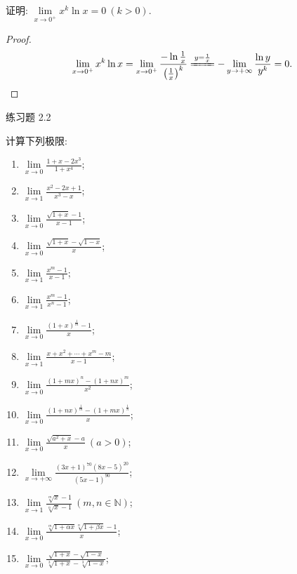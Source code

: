\begin{example}\label{ex:2.2.15}
证明: $\lim\limits_{x \to 0^+} x^k \ln x = 0\ (k > 0)$.
\end{example}

\begin{proof}
\[
\lim_{x\to 0^{+}}x^{k}\ln x = \lim_{x\to 0^{+}}\frac{-\ln\frac{1}{x}}{\left(\frac{1}{x}\right)^{k}} \xlongequal{y=\frac{1}{x}} -\lim_{y\to+\infty}\frac{\ln y}{y^{k}}=0.
\]
\end{proof}

\begin{exblock}{练习题 2.2}
\item 计算下列极限:
  \begin{enumerate}[label=(\arabic*)]
    \item $\lim\limits_{x \to 0} \frac{1 + x - 2x^{3}}{1 + x^{4}}$;
    \item $\lim\limits_{x \to 1} \frac{x^2 - 2x + 1}{x^3 - x}$;
    \item $\lim\limits_{x \to 0} \frac{\sqrt{1+x}-1}{x-1}$;
    \item $\lim\limits_{x \to 0} \frac{\sqrt{1+x} - \sqrt{1-x}}{x}$;
    \item $\lim\limits_{x \to 1} \frac{x^m - 1}{x - 1}$;
    \item $\lim\limits_{x \to 1} \frac{x^m - 1}{x^n - 1}$;
    \item $\lim\limits_{x \to 0} \frac{(1+x)^{\frac{1}{m}} - 1}{x}$;
    \item $\lim\limits_{x \to 1} \frac{x + x^{2} + \cdots + x^{m} - m}{x - 1}$;
    \item $\lim\limits_{x \to 0} \frac{(1+mx)^n - (1+nx)^m}{x^2}$;
    \item $\lim\limits_{x \to 0} \frac{(1+nx)^{\frac{1}{m}} - (1+mx)^{\frac{1}{n}}}{x}$;
    \item $\lim\limits_{x \to 0} \frac{\sqrt{a^2 + x} - a}{x}\ (a > 0)$;
    \item $\lim\limits_{x \to +\infty} \frac{(3x + 1)^{70}(8x - 5)^{20}}{(5x - 1)^{90}}$;
    \item $\lim\limits_{x \to 1} \frac{\sqrt[m]{x} - 1}{\sqrt[n]{x} - 1}\ (m, n \in \mathbb{N})$;
    \item $\lim\limits_{x\to 0}\frac{\sqrt[m]{1+\alpha x}\sqrt[n]{1+\beta x}-1}{x}$;
    \item $\lim\limits_{x \to 0} \frac{\sqrt{1+x} - \sqrt{1-x}}{\sqrt[3]{1+x} - \sqrt[3]{1-x}}$;

\end{enumerate}
\end{exblock}
